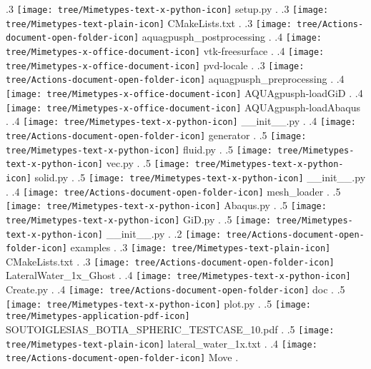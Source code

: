 {.3 { \texttt{[image: tree/Mimetypes-text-x-python-icon]} setup.py }.
.3 { \texttt{[image: tree/Mimetypes-text-plain-icon]} CMakeLists.txt }.
.3 { \texttt{[image: tree/Actions-document-open-folder-icon]} aquagpusph\_postprocessing }.
.4 { \texttt{[image: tree/Mimetypes-x-office-document-icon]} vtk-freesurface }.
.4 { \texttt{[image: tree/Mimetypes-x-office-document-icon]} pvd-locale }.
.3 { \texttt{[image: tree/Actions-document-open-folder-icon]} aquagpusph\_preprocessing }.
.4 { \texttt{[image: tree/Mimetypes-x-office-document-icon]} AQUAgpusph-loadGiD }.
.4 { \texttt{[image: tree/Mimetypes-x-office-document-icon]} AQUAgpusph-loadAbaqus }.
.4 { \texttt{[image: tree/Mimetypes-text-x-python-icon]} \_\_init\_\_.py }.
.4 { \texttt{[image: tree/Actions-document-open-folder-icon]} generator }.
.5 { \texttt{[image: tree/Mimetypes-text-x-python-icon]} fluid.py }.
.5 { \texttt{[image: tree/Mimetypes-text-x-python-icon]} vec.py }.
.5 { \texttt{[image: tree/Mimetypes-text-x-python-icon]} solid.py }.
.5 { \texttt{[image: tree/Mimetypes-text-x-python-icon]} \_\_init\_\_.py }.
.4 { \texttt{[image: tree/Actions-document-open-folder-icon]} mesh\_loader }.
.5 { \texttt{[image: tree/Mimetypes-text-x-python-icon]} Abaqus.py }.
.5 { \texttt{[image: tree/Mimetypes-text-x-python-icon]} GiD.py }.
.5 { \texttt{[image: tree/Mimetypes-text-x-python-icon]} \_\_init\_\_.py }.
.2 { \texttt{[image: tree/Actions-document-open-folder-icon]} examples }.
.3 { \texttt{[image: tree/Mimetypes-text-plain-icon]} CMakeLists.txt }.
.3 { \texttt{[image: tree/Actions-document-open-folder-icon]} LateralWater\_1x\_Ghost }.
.4 { \texttt{[image: tree/Mimetypes-text-x-python-icon]} Create.py }.
.4 { \texttt{[image: tree/Actions-document-open-folder-icon]} doc }.
.5 { \texttt{[image: tree/Mimetypes-text-x-python-icon]} plot.py }.
.5 { \texttt{[image: tree/Mimetypes-application-pdf-icon]} SOUTOIGLESIAS\_BOTIA\_SPHERIC\_TESTCASE\_10.pdf }.
.5 { \texttt{[image: tree/Mimetypes-text-plain-icon]} lateral\_water\_1x.txt }.
.4 { \texttt{[image: tree/Actions-document-open-folder-icon]} Move }.
}
